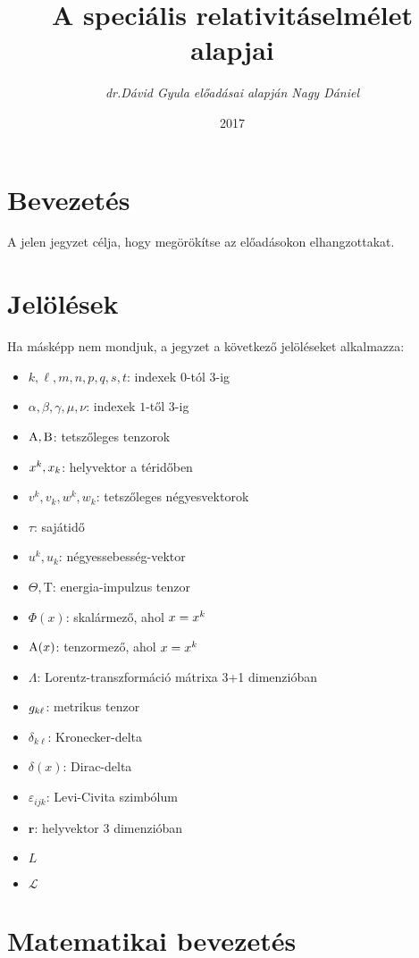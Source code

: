 \documentclass[a4paper,12pt]{article}
\title{\textbf{A speciális relativitáselmélet alapjai\\
\vspace{24pt}}}
\author{\textsl{dr.Dávid Gyula előadásai alapján Nagy Dániel}}
\date{2017}
\begin{document}
\maketitle
\pagebreak
\tableofcontents

\section{Bevezetés}
A jelen jegyzet célja, hogy megörökítse az előadásokon elhangzottakat.
\section{Jelölések}
Ha másképp nem mondjuk, a jegyzet a következő jelöléseket alkalmazza: \\
\begin{itemize}
\item $k, \ell, m, n, p, q, s, t$: indexek $0$-tól $3$-ig
\item $\alpha, \beta, \gamma, \mu, \nu$: indexek $1$-től $3$-ig
\item $\mathrm{A},\mathrm{B}$: tetszőleges tenzorok
\item $x^k, x_k$: helyvektor a téridőben
\item $v^k, v_k, w^k, w_k$: tetszőleges négyesvektorok
\item $\tau$: sajátidő
\item $u^k, u_k$: négyessebesség-vektor
\item $\Theta, \mathrm{T}$: energia-impulzus tenzor
\item $\Phi(x)$: skalármező, ahol $x=x^k$
\item $\mathrm{A}(x)$: tenzormező, ahol $x=x^k$
\item $\Lambda$: Lorentz-transzformáció mátrixa 3+1 dimenzióban
\item $g_{k\ell}$: metrikus tenzor
\item $\delta_{k\ell}$: Kronecker-delta
\item $\delta(x)$: Dirac-delta
\item $\varepsilon_{ijk}$: Levi-Civita szimbólum
\item $\mathbf{r}$: helyvektor 3 dimenzióban
\item $L$
\item $\mathcal{L}$
\end{itemize}

\pagebreak

\section{Matematikai bevezetés}

\end{document}

